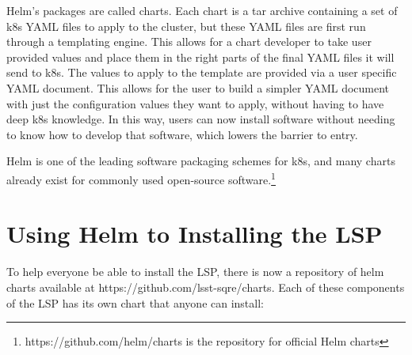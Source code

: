 \documentclass[11pt,twoside]{article}
\begin{document}
Helm's packages are called charts.  Each chart is a tar archive containing a set of
k8s YAML files to apply to the cluster, but these YAML files are first run through
a templating engine.  This allows for a chart developer to take user provided values
and place them in the right parts of the final YAML files it will send to k8s.
The values to apply to the template are provided via a user specific YAML document.
This allows for the user to build a simpler YAML document with just the configuration
values they want to apply, without having to have deep k8s knowledge.  In this way,
users can now install software without needing to know how to develop that software,
which lowers the barrier to entry.

Helm is one of the leading software packaging schemes for k8s, and many charts
already exist for commonly used open-source software.\footnote{https://github.com/helm/charts
is the repository for official Helm charts}

\section{Using Helm to Installing the LSP}

To help everyone be able to install the LSP, there is now a repository of helm
charts available at https://github.com/lsst-sqre/charts.  Each of these components
of the LSP has its own chart that anyone can install:
\end{document}
